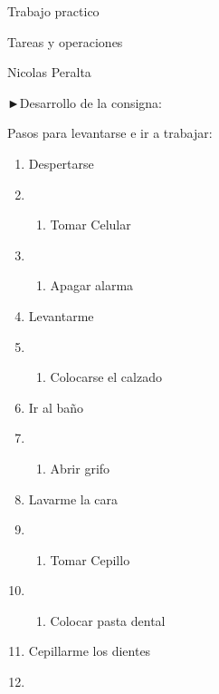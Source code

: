 Trabajo practico

Tareas y operaciones

Nicolas Peralta

►Desarrollo de la consigna:

Pasos para levantarse e ir a trabajar:

\begin{enumerate}
\def\labelenumi{\arabic{enumi}.}
\item
  Despertarse
\item
  \begin{enumerate}
  \def\labelenumii{\arabic{enumii}.}
  \tightlist
  \item
    Tomar Celular
  \end{enumerate}
\item
  \begin{enumerate}
  \def\labelenumii{\arabic{enumii}.}
  \setcounter{enumii}{1}
  \tightlist
  \item
    Apagar alarma
  \end{enumerate}
\item
  Levantarme
\item
  \begin{enumerate}
  \def\labelenumii{\arabic{enumii}.}
  \tightlist
  \item
    Colocarse el calzado
  \end{enumerate}
\item
  Ir al baño
\item
  \begin{enumerate}
  \def\labelenumii{\arabic{enumii}.}
  \tightlist
  \item
    Abrir grifo
  \end{enumerate}
\item
  Lavarme la cara
\item
  \begin{enumerate}
  \def\labelenumii{\arabic{enumii}.}
  \tightlist
  \item
    Tomar Cepillo
  \end{enumerate}
\item
  \begin{enumerate}
  \def\labelenumii{\arabic{enumii}.}
  \setcounter{enumii}{1}
  \tightlist
  \item
    Colocar pasta dental
  \end{enumerate}
\item
  Cepillarme los dientes
\item
  \begin{enumerate}
  \def\labelenumii{\arabic{enumii}.}

\end{enumerate}
\end{enumerate}
